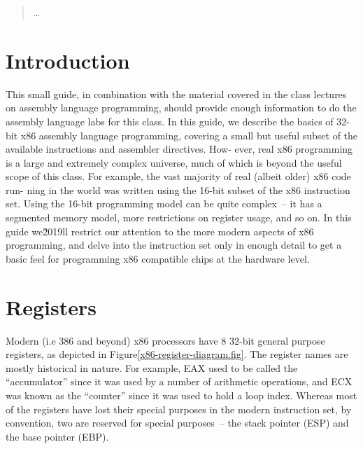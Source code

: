 \newcommand{\asminstructionsummary}[7]{
\noindent\begin{tabular}{p{1in}p{#6}p{#7}}
\multicolumn{3}{p{6.7in}}{\bf Instruction: #1} \\
\em Syntax: & \multicolumn{2}{p{5.7in}}{\tt #2} \\
\em Semantics: & \multicolumn{2}{p{5.7in}}{#3} \\
\em Examples: & \tt #4 & \tt #5 \\
\end{tabular}
}


\begin{quotation}
\ldots
\end{quotation}

\section{Introduction}

This small guide, in combination with the material covered in the
class lectures on assembly language programming, should provide enough
information to do the assembly language labs for this class. In this
guide, we describe the basics of 32-bit x86 assembly language
programming, covering a small but useful subset of the available
instructions and assembler directives. How- ever, real x86 programming
is a large and extremely complex universe, much of which is beyond the
useful scope of this class. For example, the vast majority of real
(albeit older) x86 code run- ning in the world was written using the
16-bit subset of the x86 instruction set. Using the 16-bit programming
model can be quite complex~-- it has a segmented memory model, more
restrictions on register usage, and so on. In this guide we\u2019ll
restrict our attention to the more modern aspects of x86 programming,
and delve into the instruction set only in enough detail to get a
basic feel for programming x86 compatible chips at the hardware level.

\section{Registers}

Modern (i.e 386 and beyond) x86 processors have 8 32-bit general
purpose registers, as depicted in
Figure\ref{x86-register-diagram.fig}. The register names are mostly
historical in nature. For example, EAX used to be called the
``accumulator'' since it was used by a number of arithmetic
operations, and ECX was known as the ``counter'' since it was used to
hold a loop index. Whereas most of the registers have lost their
special purposes in the modern instruction set, by convention, two are
reserved for special purposes~-- the stack pointer (ESP) and the base
pointer (EBP).


